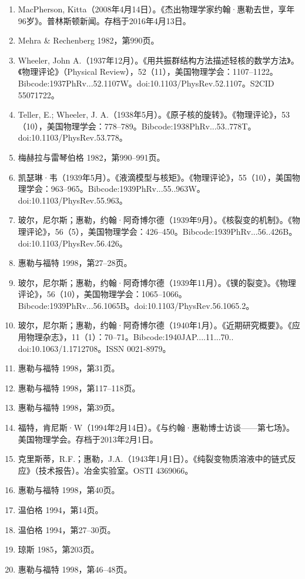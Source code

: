 \begin{enumerate}
\item MacPherson, Kitta（2008年4月14日）。《杰出物理学家约翰·惠勒去世，享年96岁》。普林斯顿新闻。存档于2016年4月13日。
\item Mehra & Rechenberg 1982，第990页。
\item Wheeler, John A.（1937年12月）。《用共振群结构方法描述轻核的数学方法》。《物理评论》（Physical Review），52（11），美国物理学会：1107–1122。Bibcode:1937PhRv...52.1107W。doi:10.1103/PhysRev.52.1107。S2CID 55071722。
\item Teller, E.; Wheeler, J. A.（1938年5月）。《原子核的旋转》。《物理评论》，53（10），美国物理学会：778–789。Bibcode:1938PhRv...53..778T。doi:10.1103/PhysRev.53.778。
\item 梅赫拉与雷琴伯格 1982，第990–991页。
\item 凯瑟琳·韦（1939年5月）。《液滴模型与核矩》。《物理评论》，55（10），美国物理学会：963–965。Bibcode:1939PhRv...55..963W。doi:10.1103/PhysRev.55.963。
\item 玻尔，尼尔斯；惠勒，约翰·阿奇博尔德（1939年9月）。《核裂变的机制》。《物理评论》，56（5），美国物理学会：426–450。Bibcode:1939PhRv...56..426B。doi:10.1103/PhysRev.56.426。
\item 惠勒与福特 1998，第27–28页。
\item 玻尔，尼尔斯；惠勒，约翰·阿奇博尔德（1939年11月）。《镤的裂变》。《物理评论》，56（10），美国物理学会：1065–1066。Bibcode:1939PhRv...56.1065B。doi:10.1103/PhysRev.56.1065.2。
\item 玻尔，尼尔斯；惠勒，约翰·阿奇博尔德（1940年1月）。《近期研究概要》。《应用物理杂志》，11（1）：70–71。Bibcode:1940JAP....11...70.. doi:10.1063/1.1712708。ISSN 0021-8979。
\item 惠勒与福特 1998，第31页。
\item 惠勒与福特 1998，第117–118页。
\item 惠勒与福特 1998，第39页。
\item 福特，肯尼斯·W（1994年2月14日）。《与约翰·惠勒博士访谈——第七场》。美国物理学会。存档于2013年2月1日。
\item 克里斯蒂，R.F.；惠勒，J.A.（1943年1月1日）。《纯裂变物质溶液中的链式反应》（技术报告）。冶金实验室。OSTI 4369066。
\item 惠勒与福特 1998，第40页。
\item 温伯格 1994，第14页。
\item 温伯格 1994，第27–30页。
\item 琼斯 1985，第203页。
\item 惠勒与福特 1998，第46–48页。

\end{enumerate}

